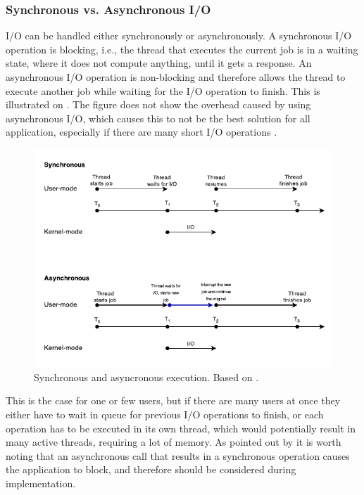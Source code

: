 \subsubsection{Synchronous vs. Asynchronous I/O}
I/O can be handled either synchronously or asynchronously. A synchronous I/O operation is blocking, i.e., the thread that executes the current job is in a waiting state, where it does not compute anything, until it gets a response. An asynchronous I/O operation is non-blocking and therefore allows the thread to execute another job while waiting for the I/O operation to finish. This is illustrated on . The figure does not show the overhead caused by using asynchronous I/O, which causes this to not be the best solution for all application, especially if there are many short I/O operations \cite{ms-syn-asyn}.

\begin{figure}[H]
  \centering
  \includegraphics[scale=1.2]{billeder/sync-async.pdf}  
  \caption{Synchronous and asyncronous execution. Based on \cite{ms-syn-asyn}.}
  \label{fig:syncasync}
\end{figure}

This is the case for one or few users, but if there are many users at once they either have to wait in queue for previous I/O operations to finish, or each operation has to be executed in its own thread, which would potentially result in many active threads, requiring a lot of memory.  As pointed out by \citet{amir} it is worth noting that an asynchronous call that results in a synchronous operation causes the application to block, and therefore should be considered during implementation.

